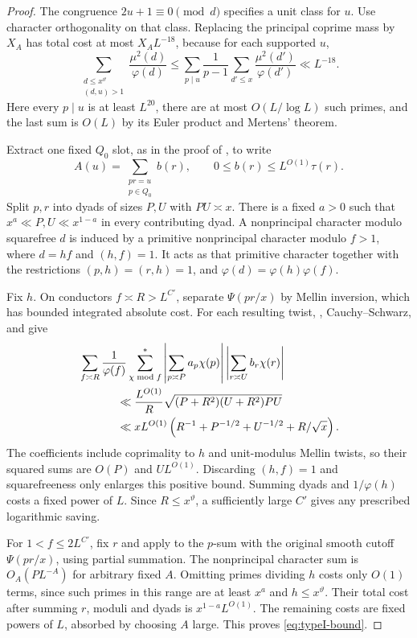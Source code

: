 \begin{proof}
The congruence $2u+1\equiv0\pmod d$ specifies a unit class for $u$.
Use character orthogonality on that class. Replacing the principal
coprime mass by $X_A$ has total cost at most $X_AL^{-18}$, because
for each supported $u$,
\[
 \sum_{\substack{d\le x^\vartheta\\(d,u)>1}}
       \frac{\mu^2(d)}{\varphi(d)}
 \le \sum_{p\mid u}\frac1{p-1}
             \sum_{d'\le x}\frac{\mu^2(d')}{\varphi(d')}
 \ll L^{-18}.
\]
Here every $p\mid u$ is at least $L^{20}$, there are at most
$O(L/\log L)$ such primes, and the last sum is $O(L)$ by its Euler
product and Mertens' theorem.

Extract one fixed $Q_0$ slot, as in the proof of
, to write
\[
 A(u)=\sum_{\substack{pr=u\\p\in Q_0}}b(r),
 \qquad 0\le b(r)\le L^{O(1)}\tau(r).
\]
Split $p,r$ into dyads of sizes $P,U$ with $PU\asymp x$.
There is a fixed $a>0$ such that $x^a\ll P,U\ll x^{1-a}$ in
every contributing dyad. A nonprincipal character modulo squarefree
$d$ is induced by a primitive nonprincipal character modulo $f>1$,
where $d=hf$ and $(h,f)=1$. It acts as that primitive character
together with the restrictions $(p,h)=(r,h)=1$, and
$\varphi(d)=\varphi(h)\varphi(f)$.

Fix $h$. On conductors $f\asymp R>L^{C'}$, separate
$\Psi(pr/x)$ by Mellin inversion, which has bounded integrated
absolute cost. For each resulting twist, ,
Cauchy--Schwarz, and  give
\begin{align*}
 &\sum_{f\asymp R}\frac1{\varphi(f)}
     \sum_{\chi\bmod f}^{*}
     \left|\sum_{p\asymp P}a_p\chi(p)\right|
     \left|\sum_{r\asymp U}b_r\chi(r)\right|\\
 &\hspace{12mm}\ll
  \frac{L^{O(1)}}R\sqrt{(P+R^2)(U+R^2)PU}\\
 &\hspace{12mm}\ll xL^{O(1)}
       \left(R^{-1}+P^{-1/2}+U^{-1/2}+R/\sqrt x\right).
\end{align*}
The coefficients include coprimality to $h$ and unit-modulus
Mellin twists, so their squared sums are $O(P)$ and
$UL^{O(1)}$. Discarding $(h,f)=1$ and squarefreeness only enlarges
this positive bound. Summing dyads and $1/\varphi(h)$ costs a fixed
power of $L$. Since $R\le x^\vartheta$, a sufficiently large $C'$
gives any prescribed logarithmic saving.

For $1<f\le2L^{C'}$, fix $r$ and apply  to the
$p$-sum with the original smooth cutoff $\Psi(pr/x)$, using partial
summation. The nonprincipal character sum is $O_A(PL^{-A})$ for
arbitrary fixed $A$. Omitting primes dividing $h$ costs only $O(1)$
terms, since such primes in this range are at least $x^a$ and
$h\le x^\vartheta$. Their total cost after summing $r$, moduli and
dyads is $x^{1-a}L^{O(1)}$. The remaining costs are fixed powers of
$L$, absorbed by choosing $A$ large. This proves
\eqref{eq:typeI-bound}.
\end{proof}

